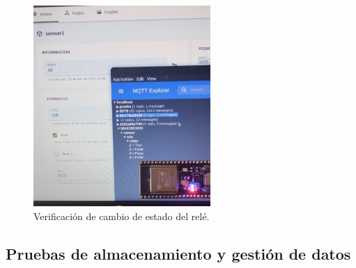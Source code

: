 \begin{itemize}
\begin{figure}[H]
\centering 
\includegraphics[width=0.6\textwidth]{./Figures/op_rele.png}
\caption{Verificación de cambio de estado del relé.}
\label{fig:op_rele}
\end{figure}  
    
    
\end{itemize}

\subsection{Pruebas de almacenamiento y gestión de datos}

